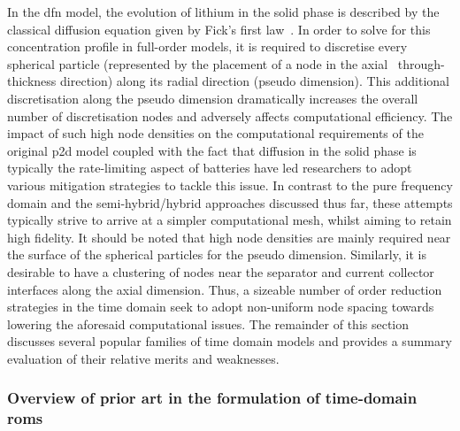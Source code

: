 
In the \gls{dfn} model, the evolution of lithium in the solid phase is described
by the classical  diffusion equation given by  Fick's first law~\cite{Fick1995}.
In order  to solve for  this concentration profile  in full-order models,  it is
required to discretise every spherical particle (represented by the placement of
a  node  in  the  axial  \ie~through-thickness  direction)  along  its  radial
direction (pseudo  dimension). This  additional discretisation along  the pseudo
dimension dramatically increases the overall  number of discretisation nodes and
adversely  affects  computational  efficiency.  The impact  of  such  high  node
densities  on the  computational requirements  of the  original \gls{p2d}  model
coupled  with the  fact  that diffusion  in  the solid  phase  is typically  the
rate-limiting  aspect  of  batteries  have  led  researchers  to  adopt  various
mitigation strategies  to tackle this issue.  In contrast to the  pure frequency
domain and the semi-hybrid/hybrid approaches  discussed thus far, these attempts
typically strive  to arrive at  a simpler  computational mesh, whilst  aiming to
retain high  fidelity. It should  be noted that  high node densities  are mainly
required near the  surface of the spherical particles for  the pseudo dimension.
Similarly, it is desirable to have a clustering  of nodes near the  separator
and current collector interfaces along the axial dimension. Thus, a sizeable
number  of order reduction strategies in the time  domain seek to adopt
non-uniform node  spacing towards lowering the aforesaid computational issues.
The remainder of  this  section discusses  several  popular  families  of time
domain  models and  provides a  summary evaluation  of  their relative  merits
and  weaknesses.

\subsubsection*{Overview of prior art in the formulation of time-domain \glspl{rom}}


